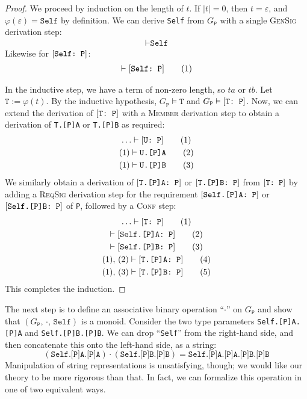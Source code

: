 \documentclass[../generics]{subfiles}
\begin{document}
\begin{proof}
We proceed by induction on the length of $t$. If $|t|=0$, then $t=\varepsilon$, and $\varphi(\varepsilon)=\texttt{Self}$ by definition. We can derive \texttt{Self} from $G_\texttt{P}$ with a single \textsc{GenSig} derivation step:
\begin{gather*}
\vdash\texttt{Self}\tag{1}
\end{gather*}
Likewise for $[\texttt{Self:~P}]$:
\begin{gather*}
\vdash[\texttt{Self:~P}]\tag{1}
\end{gather*}

In the inductive step, we have a term of non-zero length, so $ta$ or $tb$. Let $\texttt{T}:=\varphi(t)$. By the inductive hypothesis, $G_\texttt{P}\vDash\texttt{T}$ and $G_\texttt{P}\vDash[\texttt{T:~P}]$. Now, we can extend the derivation of $[\texttt{T:~P}]$ with a \textsc{Member} derivation step to obtain a derivation of \texttt{T.[P]A} or \texttt{T.[P]B} as required:
\begin{gather*}
\ldots\vdash[\texttt{U:~P}]\tag{1}\\
(1)\vdash\texttt{U.[P]A}\tag{2}\\
(1)\vdash\texttt{U.[P]B}\tag{3}
\end{gather*}
We similarly obtain a derivation of $[\texttt{T.[P]A:~P}]$ or $[\texttt{T.[P]B:~P}]$ from $[\texttt{T:~P}]$ by adding a \textsc{ReqSig} derivation step for the requirement $[\texttt{Self.[P]A:~P}]$ or $[\texttt{Self.[P]B:~P}]$ of \texttt{P}, followed by a \textsc{Conf} step:
\begin{gather*}
\ldots\vdash[\texttt{T:~P}]\tag{1}\\
\vdash[\texttt{Self.[P]A:~P}]\tag{2}\\
\vdash[\texttt{Self.[P]B:~P}]\tag{3}\\
(1),\,(2)\vdash[\texttt{T.[P]A:~P}]\tag{4}\\
(1),\,(3)\vdash[\texttt{T.[P]B:~P}]\tag{5}
\end{gather*}
This completes the induction.
\end{proof}

The next step is to define an associative binary operation ``$\cdot$'' on $G_\texttt{P}$ and show that $(G_\texttt{P},\,\cdot,\,\texttt{Self})$ is a monoid. Consider the two type parameters \texttt{Self.[P]A.[P]A} and \texttt{Self.[P]B.[P]B}. We can drop ``\texttt{Self}'' from the right-hand side, and then concatenate this onto the left-hand side, as a string:
\[(\texttt{Self.[P]A.[P]A})\cdot(\texttt{Self.[P]B.[P]B})=\texttt{Self.[P]A.[P]A.[P]B.[P]B}\]
Manipulation of string representations is unsatisfying, though; we would like our theory to be more rigorous than that. In fact, we can formalize this operation in one of two equivalent ways.
\end{document}
